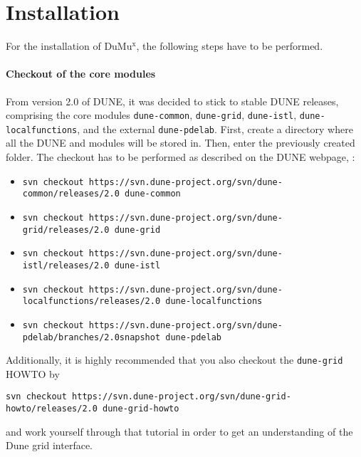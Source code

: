 \section{Installation} 
\label{install}

For the installation of DuMu$^\text{x}$, the following steps have to be performed.  

\paragraph{Checkout of the core modules}
From version 2.0 of DUNE, it was decided to stick to stable DUNE releases, comprising the core modules 
\texttt{dune-common}, \texttt{dune-grid}, \texttt{dune-istl}, \texttt{dune-localfunctions}, and the external \texttt{dune-pdelab}.  
First, create a directory where all the DUNE and \Dumux modules will be stored in. Then, enter the previously created folder. 
The checkout has to be performed as described on 
the DUNE webpage, \cite{DUNE-HP}: 
\begin{itemize}
\item \texttt{svn checkout https://svn.dune-project.org/svn/dune-common/releases/2.0 dune-common}
\item \texttt{svn checkout https://svn.dune-project.org/svn/dune-grid/releases/2.0 dune-grid}
\item \texttt{svn checkout https://svn.dune-project.org/svn/dune-istl/releases/2.0 dune-istl}
\item \texttt{svn checkout https://svn.dune-project.org/svn/dune-localfunctions/releases/2.0 dune-localfunctions}
\item \texttt{svn checkout https://svn.dune-project.org/svn/dune-pdelab/branches/2.0snapshot dune-pdelab}
\end{itemize} 

Additionally, it is highly recommended that you also checkout the \texttt{dune-grid} HOWTO 
by 
\begin{center}
\texttt{svn checkout https://svn.dune-project.org/svn/dune-grid-howto/releases/2.0 dune-grid-howto}
\end{center}
and work yourself through that tutorial in order to get an understanding of 
the Dune grid interface. 

